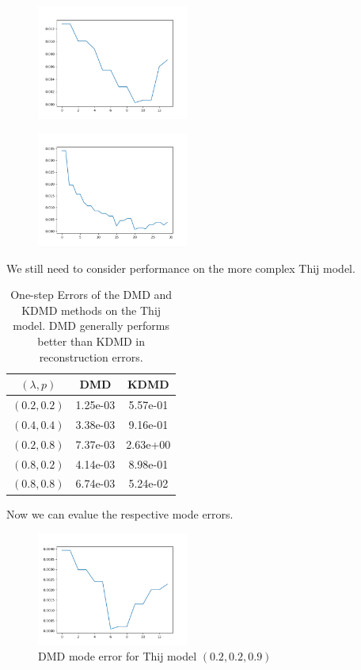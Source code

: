 \begin{figure}
    \includegraphics[width=5cm]{Images/mode_error_dmd_prefattach2.png}
    \centering
\end{figure}

\begin{figure}
    \includegraphics[width=5cm]{Images/mode_error_kdmd_prefattach2.png}
    \centering
\end{figure}

\FloatBarrier

We still need to consider performance on the more complex Thij model.


\begin{table}
    \centering
    \begin{tabular}{||c c c ||} 
    \hline
    $(\lambda,p)$ & DMD & KDMD  \\ [0.5ex] 
    \hline\hline
    $(0.2,0.2)$ & 1.25e-03 &  5.57e-01\\ 
    \hline
    $(0.4,0.4)$ & 3.38e-03 & 9.16e-01 \\
    \hline
    $(0.2,0.8)$ & 7.37e-03 & 2.63e+00 \\
    \hline
    $(0.8,0.2)$ & 4.14e-03 & 8.98e-01\\
    \hline
    $(0.8,0.8)$ & 6.74e-03 &  5.24e-02 \\
    \hline
   \end{tabular}
   \caption{One-step Errors of the DMD and KDMD methods on the Thij model.
   DMD generally performs better than KDMD in reconstruction errors.}
   \label{table:15}
\end{table}

Now we can evalue the respective mode errors.

\begin{figure}
    \includegraphics[width=5cm]{Images/mode_error_dmd_twitter_020209.png}
    \centering
    \caption{DMD mode error for Thij model $(0.2,0.2,0.9)$}
\end{figure}

